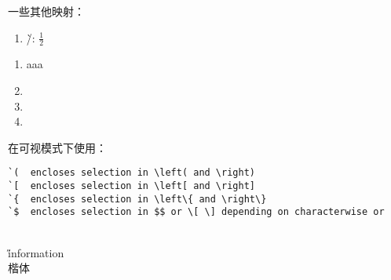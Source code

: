 \documentclass[12pt]{article}
\begin{document}
一些其他映射：
\begin{enumerate}
    \item \`/: $\frac{1}{2}$
\end{enumerate}

\begin{enumerate}
    \item  aaa
    \item 
    \item 
    \item 
\end{enumerate}
在可视模式下使用：

\begin{verbatim}
`(  encloses selection in \left( and \right)
`[  encloses selection in \left[ and \right]
`{  encloses selection in \left\{ and \right\}
`$  encloses selection in $$ or \[ \] depending on characterwise or
\end{verbatim}


\\
\H information\\
\K 楷体
\end{document}
